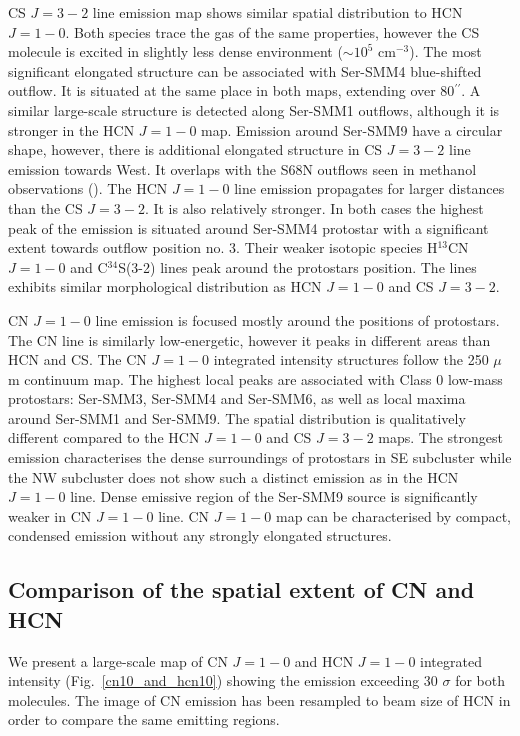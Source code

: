 \documentclass{aa}
\begin{document}
CS $J=3-2$ line emission map shows similar spatial distribution to HCN $J=1-0$. Both species trace the gas of the same properties, however the CS molecule is excited in slightly less dense environment ($\sim 10^5$ cm$^{-3}$). The most significant elongated structure can be associated with Ser-SMM4 blue-shifted outflow. It is situated at the same place in both maps, extending over 80$^{\prime\prime}$. A similar large-scale structure is detected along Ser-SMM1 outflows, although it is stronger in the HCN $J=1-0$ map. Emission around Ser-SMM9 have a circular shape, however, there is additional elongated structure in CS $J=3-2$ line emission towards West. It overlaps with the S68N outflows seen in methanol observations (\citealt{Kri10}). The HCN $J=1-0$  line emission propagates for larger distances than the CS $J=3-2$. It is also relatively stronger. In both cases the highest peak of the emission is situated around Ser-SMM4 protostar with a significant extent towards outflow position no. 3. Their weaker isotopic species H$^{13}$CN $J=1-0$ and \mbox{C$^{34}$S(3-2)} lines peak around the protostars position. The lines exhibits similar morphological distribution as HCN $J=1-0$ and CS $J=3-2$.

CN $J=1-0$ line emission is focused mostly around the positions of protostars. The CN line is similarly low-energetic, however it peaks in different areas than HCN and CS. The CN $J=1-0$ integrated intensity structures follow the 250 $\mu$m continuum map. The highest local peaks are associated with Class 0 low-mass protostars: Ser-SMM3, Ser-SMM4 and Ser-SMM6, as well as local maxima around Ser-SMM1 and Ser-SMM9. The spatial distribution is qualitatively different compared to the HCN $J=1-0$ and CS $J=3-2$ maps. The strongest emission characterises the dense surroundings of protostars in SE subcluster while the NW subcluster does not show such a distinct emission as in the HCN $J=1-0$ line. Dense emissive region of the Ser-SMM9 source is significantly weaker in CN $J=1-0$ line. CN $J=1-0$ map can be characterised by compact, condensed emission without any strongly elongated structures. 


\subsection{Comparison of the spatial extent of CN and HCN}

We present a large-scale map of CN $J=1-0$ and HCN $J=1-0$ integrated intensity (Fig.~\ref{cn10_and_hcn10}) showing the emission exceeding 30 $\sigma$ for both molecules. The image of CN emission has been resampled to beam size of HCN in order to compare the same emitting regions. 
\end{document}
